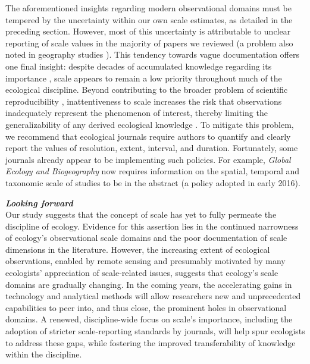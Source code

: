 \documentclass[12pt]{article}
\begin{document}
The aforementioned insights regarding modern observational domains must be tempered by the uncertainty within our own scale estimates, as detailed in the preceding section. However, most of this uncertainty is attributable to unclear reporting of scale values in the majority of papers we reviewed (a problem also noted in geography studies \cite{margulies_ambiguous_2016}). This tendency towards vague documentation offers one final insight: despite decades of accumulated knowledge regarding its importance \cite{levin_problem_1992, wiens_spatial_1989, chave_problem_2013, wheatley_factors_2009}, scale appears to remain a low priority throughout much of the ecological discipline. Beyond contributing to the broader problem of scientific reproducibility \cite{baker_1500_2016}, inattentiveness to scale increases the risk that observations inadequately represent the phenomenon of interest, thereby limiting the generalizability of any derived ecological knowledge \cite{margulies_ambiguous_2016, wheatley_factors_2009, wiens_spatial_1989}. To mitigate this problem, we recommend that ecological journals require authors to quantify and clearly report the values of resolution, extent, interval, and duration. Fortunately, some journals already appear to be implementing such policies. For example, \emph{Global Ecology and Biogeography} now requires information on the spatial, temporal and taxonomic scale of studies to be in the abstract (a policy adopted in early 2016).

\vspace{5pt}
\noindent \textbf{\emph{Looking forward}}\\
Our study suggests that the concept of scale has yet to fully permeate the discipline of ecology. Evidence for this assertion lies in the continued narrowness of ecology's observational scale domains and the poor documentation of scale dimensions in the literature. However, the increasing extent of ecological observations, enabled by remote sensing and presumably motivated by many ecologists' appreciation of scale-related issues, suggests that ecology's scale domains are gradually changing. In the coming years, the accelerating gains in technology and analytical methods will allow researchers new and unprecedented capabilities to peer into, and thus close, the prominent holes in observational domains. A renewed, discipline-wide focus on scale's importance, including the adoption of stricter scale-reporting standards by journals, will help spur ecologists to address these gaps, while fostering the improved transferability of knowledge within the discipline.  
\end{document}
